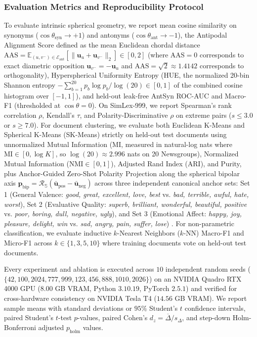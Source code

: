 \documentclass[journal]{IEEEtran}
\begin{document}
\subsubsection{Evaluation Metrics and Reproducibility Protocol}
To evaluate intrinsic spherical geometry, we report mean cosine similarity on synonyms ($\cos\theta_{\text{syn}} \to +1$) and antonyms ($\cos\theta_{\text{ant}} \to -1$), the Antipodal Alignment Score defined as the mean Euclidean chordal distance $\text{AAS} = \mathbb{E}_{(u,v^-)\in\mathcal{E}_{\text{ant}}}[\|\mathbf{u}_u + \mathbf{u}_{v^-}\|_2] \in [0, 2]$ (where $\text{AAS} = 0$ corresponds to exact diametric opposition $\mathbf{u}_{v^-} = -\mathbf{u}_u$ and $\text{AAS} = \sqrt{2} \approx 1.4142$ corresponds to orthogonality), Hyperspherical Uniformity Entropy (HUE, the normalized 20-bin Shannon entropy $-\sum_{b=1}^{20} p_b \log p_b / \log(20) \in [0, 1]$ of the combined cosine histogram over $[-1, 1]$), and held-out leak-free AntSyn ROC-AUC and Macro-F1 (thresholded at $\cos\theta = 0$). On SimLex-999, we report Spearman's rank correlation $\rho$, Kendall's $\tau$, and Polarity-Discriminative $\rho$ on extreme pairs ($s \le 3.0$ or $s \ge 7.0$). For document clustering, we evaluate both Euclidean K-Means and Spherical K-Means (SK-Means) strictly on held-out test documents using unnormalized Mutual Information (MI, measured in natural-log nats where $\text{MI} \in [0, \log K]$, so $\log(20) \approx 2.996$ nats on 20 Newsgroups), Normalized Mutual Information ($\text{NMI} \in [0, 1]$), Adjusted Rand Index (ARI), and Purity, plus Anchor-Guided Zero-Shot Polarity Projection along the spherical bipolar axis $\mathbf{p}_{\text{bip}} = \mathcal{R}_{\mathbb{S}}(\bar{\mathbf{u}}_{\text{pos}} - \bar{\mathbf{u}}_{\text{neg}})$ across three independent canonical anchor sets: Set 1 (General Valence: \textit{good, great, excellent, love, best} vs. \textit{bad, terrible, awful, hate, worst}), Set 2 (Evaluative Quality: \textit{superb, brilliant, wonderful, beautiful, positive} vs. \textit{poor, boring, dull, negative, ugly}), and Set 3 (Emotional Affect: \textit{happy, joy, pleasure, delight, win} vs. \textit{sad, angry, pain, suffer, lose}) \cite{turney2002thumbs,hamilton2016inducing}. For non-parametric classification, we evaluate inductive $k$-Nearest Neighbors ($k$-NN) Macro-F1 and Micro-F1 across $k \in \{1, 3, 5, 10\}$ where training documents vote on held-out test documents.

Every experiment and ablation is executed across $10$ independent random seeds ($\{42, 100, 2024, 777, 999, 123, 456, 888, 1010, 2026\}$) on an NVIDIA Quadro RTX 4000 GPU ($8.00$ GB VRAM, Python $3.10.19$, PyTorch $2.5.1$) and verified for cross-hardware consistency on NVIDIA Tesla T4 ($14.56$ GB VRAM). We report sample means with standard deviations or $95\%$ Student's $t$ confidence intervals, paired Student's $t$-test $p$-values, paired Cohen's $d_z = \overline{\Delta} / s_{\Delta}$, and step-down Holm-Bonferroni adjusted $p_{\text{holm}}$ values.
\end{document}
